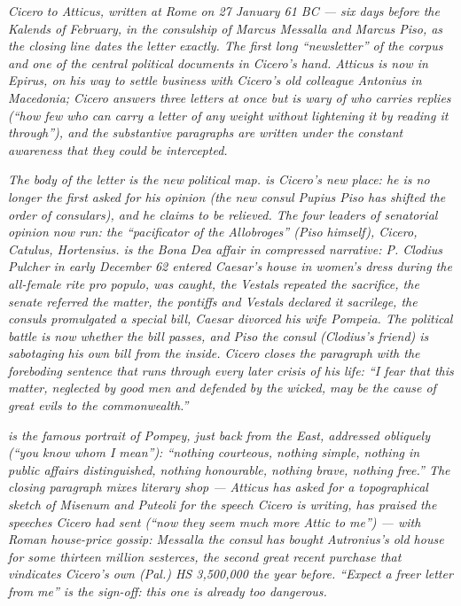 
\textit{Cicero to Atticus, written at Rome on 27 January 61
BC --- six days before the Kalends of February, in the
consulship of Marcus Messalla and Marcus Piso, as the
closing line dates the letter exactly. The first long
``newsletter'' of the corpus and one of the central
political documents in Cicero's hand. Atticus is now in
Epirus, on his way to settle business with Cicero's old
colleague Antonius in Macedonia; Cicero answers three
letters at once but is wary of who carries replies (``how
few who can carry a letter of any weight without lightening
it by reading it through''), and the substantive paragraphs
are written under the constant awareness that they could
be intercepted.}

\textit{The body of the letter is the new political map.
 is Cicero's new place: he is no longer the
first asked for his opinion (the new consul Pupius Piso has
shifted the order of consulars), and he claims to be relieved.
The four leaders of senatorial opinion now run: the
``pacificator of the Allobroges'' (Piso himself), Cicero,
Catulus, Hortensius.  is the Bona Dea affair
in compressed narrative: P. Clodius Pulcher in early December
62 entered Caesar's house in women's dress during the
all-female rite \textit{pro populo}, was caught, the Vestals
repeated the sacrifice, the senate referred the matter, the
pontiffs and Vestals declared it sacrilege, the consuls
promulgated a special bill, Caesar divorced his wife
Pompeia. The political battle is now whether the bill
passes, and Piso the consul (Clodius's friend) is sabotaging
his own bill from the inside. Cicero closes the paragraph
with the foreboding sentence that runs through every later
crisis of his life: ``I fear that this matter, neglected by
good men and defended by the wicked, may be the cause of
great evils to the commonwealth.''}

\textit{ is the famous portrait of Pompey,
just back from the East, addressed obliquely (``you know
whom I mean''): ``nothing courteous, nothing simple, nothing
in public affairs distinguished, nothing honourable, nothing
brave, nothing free.'' The closing paragraph mixes literary
shop --- Atticus has asked for a topographical sketch of
Misenum and Puteoli for the speech Cicero is writing, has
praised the speeches Cicero had sent (``now they seem much
more Attic to me'') --- with Roman house-price gossip:
Messalla the consul has bought Autronius's old house for
some thirteen million sesterces, the second great recent
purchase that vindicates Cicero's own (Pal.) HS 3,500,000
the year before. ``Expect a freer letter from me'' is the
sign-off: this one is already too dangerous.}
